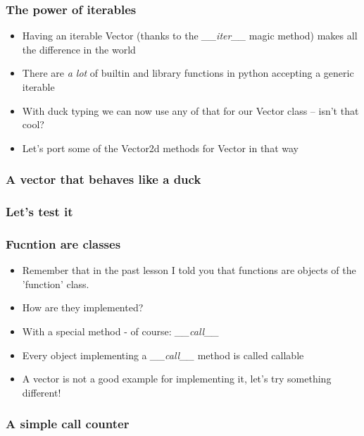 \documentclass[9pt]{beamer}
\begin{document}
\begin{frame}
  \frametitle{The power of iterables}
  
  \begin{itemize}
    \item Having an iterable Vector (thanks to the \emph{\_\_iter\_\_} magic
          method) makes all the difference in the world
    \medskip
    \item There are \emph{a lot} of builtin and library functions in python accepting a
          generic iterable
    \medskip
    \item With duck typing we can now use any of that for our Vector class -- isn't that cool?
    \medskip
    \item Let's port some of the Vector2d methods for Vector in that way
  \end{itemize}
  
\end{frame}


\begin{frame}
  \frametitle{A vector that behaves like a duck}
  
\end{frame}


\begin{frame}
  \frametitle{Let's test it}
  
\end{frame}


\begin{frame}
  \frametitle{Fucntion are classes}
  
  \begin{itemize}
    \item Remember that in the past lesson I told you that functions are objects
          of the 'function' class.
    \medskip
    \item How are they implemented?
    \medskip
    \item With a special method - of course: \emph{\_\_call\_\_}
    \medskip
    \item Every object implementing a \emph{\_\_call\_\_} method is called \alert{callable}
    \medskip
    \item A vector is not a good example for implementing it, let's try something
          different!
  \end{itemize}
  
\end{frame}


\begin{frame}
  \frametitle{A simple call counter}
  
\end{frame}
\end{document}

